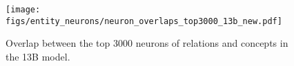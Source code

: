 






\begin{figure}[tb]
    \centering
   \setlength{\abovecaptionskip}{-0.05cm}
   \setlength{\belowcaptionskip}{-0.5cm}
\texttt{[image: figs/entity\_neurons/neuron\_overlaps\_top3000\_13b\_new.pdf]}
    \caption{Overlap between the top 3000 neurons of
      relations and  concepts in the 13B model.}
    \label{fig:entity_neuron_overlap}
\end{figure}

